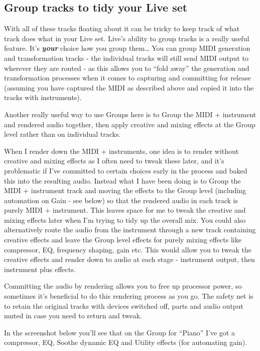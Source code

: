 \documentclass[
  12pt,
  letterpaper,
  oneside,
  open=any]{scrbook}
\begin{document}
\subsection{Group tracks to tidy your Live
set}\label{group-tracks-to-tidy-your-live-set}

With all of these tracks floating about it can be tricky to keep track
of what track does what in your Live set. Live's ability to group tracks
is a really useful feature. It's \textbf{\emph{your}} choice how you
group them\ldots{} You can group MIDI generation and transformation
tracks - the individual tracks will still send MIDI output to wherever
they are routed - as this allows you to ``fold away'' the generation and
transformation processes when it comes to capturing and committing for
release (assuming you have captured the MIDI as described above and
copied it into the tracks with instruments).

Another really useful way to use Groups here is to Group the MIDI +
instrument and rendered audio together, then apply creative and mixing
effects at the Group level rather than on individual tracks.

When I render down the MIDI + instruments, one idea is to render without
creative and mixing effects as I often need to tweak these later, and
it's problematic if I've committed to certain choices early in the
process and baked this into the resulting audio. Instead what I have
been doing is to Group the MIDI + instrument track and moving the
effects to the Group level (including automation on Gain - see below) so
that the rendered audio in each track is purely MIDI + instrument. This
leaves space for me to tweak the creative and mixing effects later when
I'm trying to tidy up the overall mix. You could also alternatively
route the audio from the instrument through a new track containing
creative effects and leave the Group level effects for purely mixing
effects like compressor, EQ, frequency shaping, gain etc. This would
allow you to tweak the creative effects and render down to audio at each
stage - instrument output, then instrument plus effects.

Committing the audio by rendering allows you to free up processor power,
so sometimes it's beneficial to do this rendering process as you go. The
safety net is to retain the original tracks with devices switched off,
parts and audio output muted in case you need to return and tweak.

In the screenshot below you'll see that on the Group for ``Piano'' I've
got a compressor, EQ, Soothe dynamic EQ and Utility effects (for
automating gain).
\end{document}
